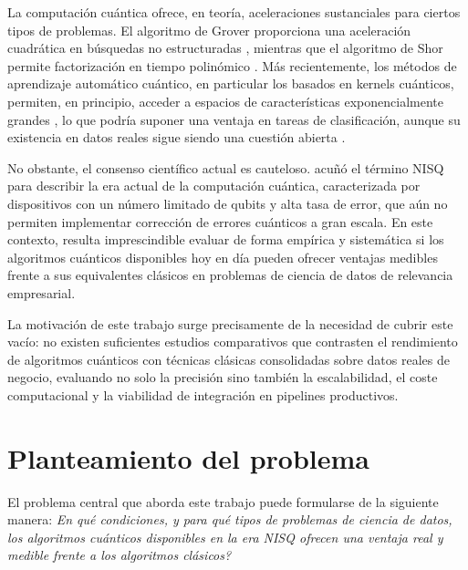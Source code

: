 La computación cuántica ofrece, en teoría, aceleraciones sustanciales para ciertos tipos de problemas. El algoritmo de Grover proporciona una aceleración cuadrática en búsquedas no estructuradas \citep{grover1996}, mientras que el algoritmo de Shor permite factorización en tiempo polinómico \citep{shor1994}. Más recientemente, los métodos de aprendizaje automático cuántico, en particular los basados en kernels cuánticos, permiten, en principio, acceder a espacios de características exponencialmente grandes \citep{havlicek2019, schuld2021}, lo que podría suponer una ventaja en tareas de clasificación, aunque su existencia en datos reales sigue siendo una cuestión abierta \citep{huang2021, thanasilp2022}.

No obstante, el consenso científico actual es cauteloso. \cite{preskill2018} acuñó el término NISQ para describir la era actual de la computación cuántica, caracterizada por dispositivos con un número limitado de qubits y alta tasa de error, que aún no permiten implementar corrección de errores cuánticos a gran escala. En este contexto, resulta imprescindible evaluar de forma empírica y sistemática si los algoritmos cuánticos disponibles hoy en día pueden ofrecer ventajas medibles frente a sus equivalentes clásicos en problemas de ciencia de datos de relevancia empresarial.

La motivación de este trabajo surge precisamente de la necesidad de cubrir este vacío: no existen suficientes estudios comparativos que contrasten el rendimiento de algoritmos cuánticos con técnicas clásicas consolidadas sobre datos reales de negocio, evaluando no solo la precisión sino también la escalabilidad, el coste computacional y la viabilidad de integración en pipelines productivos.

\section{Planteamiento del problema}

El problema central que aborda este trabajo puede formularse de la siguiente manera: \textit{\textquestiondown{}En qué condiciones, y para qué tipos de problemas de ciencia de datos, los algoritmos cuánticos disponibles en la era NISQ ofrecen una ventaja real y medible frente a los algoritmos clásicos?}

